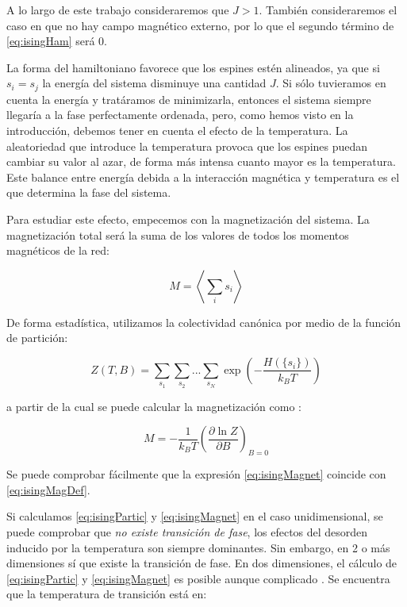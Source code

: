 \documentclass[11pt, a4paper]{article} %
\theoremstyle{named}
\begin{document}
A lo largo de este trabajo consideraremos que $J>1$. También consideraremos el caso en que no hay campo magnético externo, por lo que el segundo término de \eqref{eq:isingHam} será $0$.

La forma del hamiltoniano favorece que los espines estén alineados, ya que si $s_i = s_j$ la energía del sistema disminuye una cantidad $J$. Si sólo tuvieramos en cuenta la energía y tratáramos de minimizarla, entonces el sistema siempre llegaría a la fase perfectamente ordenada, pero, como hemos visto en la introducción, debemos tener en cuenta el efecto de la temperatura. La aleatoriedad que introduce la temperatura provoca que los espines puedan cambiar su valor al azar, de forma más intensa cuanto mayor es la temperatura. Este balance entre energía debida a la interacción magnética y temperatura es el que determina la fase del sistema.

Para estudiar este efecto, empecemos con la magnetización del sistema. La magnetización total será la suma de los valores de todos los momentos magnéticos de la red:

\begin{equation}\label{eq:isingMagDef}
    M = \left \langle \sum_i s_i \right \rangle
\end{equation}

De forma estadística, utilizamos la colectividad canónica por medio de la función de partición:

\begin{equation}\label{eq:isingPartic}
    Z(T,B) = \sum_{s_1} \sum_{s_2}...\sum_{s_N} \exp \left( -\frac{H(\{s_i\})}{k_B T} \right)
\end{equation}

a partir de la cual se puede calcular la magnetización como \cite{allen}:

\begin{equation}\label{eq:isingMagnet}
    M = - \frac{1}{k_B T} \left( \frac{\partial \ln Z}{\partial B} \right)_ {B=0}
\end{equation}

Se puede comprobar fácilmente que la expresión \eqref{eq:isingMagnet} coincide con \eqref{eq:isingMagDef}.

Si calculamos \eqref{eq:isingPartic} y \eqref{eq:isingMagnet} en el caso unidimensional, se puede comprobar que \textit{no existe transición de fase}, los efectos del desorden inducido por la temperatura son siempre dominantes. Sin embargo, en 2 o más dimensiones sí que existe la transición de fase. En dos dimensiones, el cálculo de \eqref{eq:isingPartic} y \eqref{eq:isingMagnet} es posible aunque complicado \cite{huang}. Se encuentra que la temperatura de transición está en:
\end{document}
